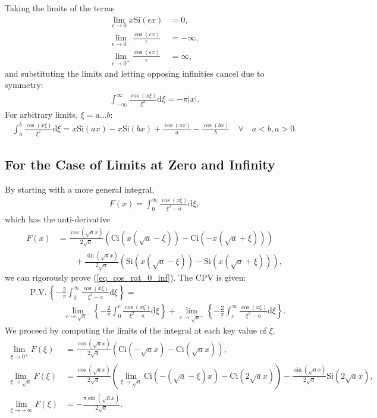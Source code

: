 Taking the limits of the terms
\begin{align}
	\lim_{\epsilon \to 0 } x \mathrm{Si}(\epsilon x) &= 0, \\
	\lim_{\epsilon \to 0^-} \frac{\cos(\epsilon x)}{\epsilon} &= -\infty, \\
	\lim_{\epsilon \to 0^+} \frac{\cos(\epsilon x)}{\epsilon} &= \infty,
\end{align}
and substituting the limits and letting opposing infinities cancel due to symmetry:
\begin{align}
	\int_{-\infty}^{\infty} \! \frac{\cos(x \xi)}{\xi^2} \mathrm{d}\xi = -\pi|x|.
\end{align}
For arbitrary limits, $\xi = a...b$:
\begin{align}
	\int_a^b \! \frac{\cos(x \xi)}{\xi^2} \mathrm{d}\xi = x\mathrm{Si}(ax) - x\mathrm{Si}(bx) + \frac{\cos(ax)}{a} - \frac{\cos(bx)}{b}
	\quad \forall \quad a < b, a > 0.
\end{align}
\subsection{For the Case of Limits at Zero and Infinity}
By starting with a more general integral,
\begin{align}
	F(x) = \int_0^{\infty} \! \frac{\cos(x \xi)}{\xi^2 -a} \mathrm{d} \xi,
\end{align}
which has the anti-derivative
\begin{align}
	F(x) &= \frac{\cos(\sqrt{a}x)}{2\sqrt{a}} \left(\mathrm{Ci}\left(x(\sqrt{a} - \xi)\right) - \mathrm{Ci}\left(-x(\sqrt{a} + \xi)\right) \right) \\
	&\quad\quad +\frac{\sin(\sqrt{a}x)}{2\sqrt{a}} \left(\mathrm{Si}\left(x(\sqrt{a} - \xi)\right) - \mathrm{Si}\left(x(\sqrt{a} + \xi)\right) \right),
\end{align}
we can rigorously prove (\ref{eq_cos_rat_0_inf}).
The CPV is given:
\begin{align}
	&\mathrm{P.V.} \, \left\{-\frac{2}{\pi} \int_0^{\infty} \! \frac{\cos(x \xi)}{\xi^2 -a} \mathrm{d} \xi \right\} = \\
    &\quad\quad\quad\quad \lim_{c \to \sqrt{a}^-} \left\{ -\frac{2}{\pi} \int_0^{c} \! \frac{\cos(x \xi)}{\xi^2 -a} \mathrm{d} \xi \right\}
    + \lim_{c \to \sqrt{a}^+} \left\{ -\frac{2}{\pi} \int_c^{\infty} \! \frac{\cos(x \xi)}{\xi^2 -a} \mathrm{d} \xi \right\}.
\end{align}
We proceed by computing the limits of the integral at each key value of $\xi$.
\begin{align}
	\lim_{\xi \to 0^+} F(\xi) &= \frac{\cos\left(\sqrt{a}x\right)}{2\sqrt{a}} \left( 
		\mathrm{Ci}(-\sqrt{a}x) - \mathrm{Ci}(\sqrt{a}x)\right), \\
	\lim_{\xi \to \sqrt{a}} F(\xi) &= \frac{\cos\left(\sqrt{a}x\right)}{2\sqrt{a}} \left(
	    \lim_{\xi \to \sqrt{a}} \mathrm{Ci}\left(-(\sqrt{a}-\xi)x\right) - \mathrm{Ci}\left(2\sqrt{a}x\right) \right) - \frac{\sin\left(\sqrt{a}x\right)}{2\sqrt{a}} \mathrm{Si}\left(2\sqrt{a} x\right) \label{eq_lim_sqrt_a_cos_xi_integral},\\
	\lim_{\xi \to +\infty} F(\xi) &= -\frac{\pi \sin\left(\sqrt{a} x \right)}{2 \sqrt{a}}.
\end{align}

